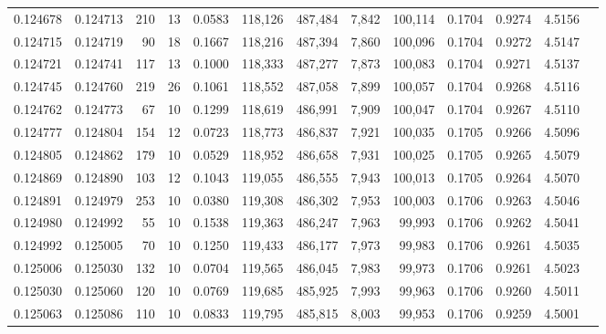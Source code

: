 \begin{tabular}{rrrrrrrrrrrrr}
0.124678 & 0.124713 &   210 &  13 &                                     0.0583 & 118,126 & 487,484 &   7,842 & 100,114 & 0.1704 & 0.9274 & 4.5156 \\
0.124715 & 0.124719 &    90 &  18 &                                     0.1667 & 118,216 & 487,394 &   7,860 & 100,096 & 0.1704 & 0.9272 & 4.5147 \\
0.124721 & 0.124741 &   117 &  13 &                                     0.1000 & 118,333 & 487,277 &   7,873 & 100,083 & 0.1704 & 0.9271 & 4.5137 \\
0.124745 & 0.124760 &   219 &  26 &                                     0.1061 & 118,552 & 487,058 &   7,899 & 100,057 & 0.1704 & 0.9268 & 4.5116 \\
0.124762 & 0.124773 &    67 &  10 &                                     0.1299 & 118,619 & 486,991 &   7,909 & 100,047 & 0.1704 & 0.9267 & 4.5110 \\
0.124777 & 0.124804 &   154 &  12 &                                     0.0723 & 118,773 & 486,837 &   7,921 & 100,035 & 0.1705 & 0.9266 & 4.5096 \\
0.124805 & 0.124862 &   179 &  10 &                                     0.0529 & 118,952 & 486,658 &   7,931 & 100,025 & 0.1705 & 0.9265 & 4.5079 \\
0.124869 & 0.124890 &   103 &  12 &                                     0.1043 & 119,055 & 486,555 &   7,943 & 100,013 & 0.1705 & 0.9264 & 4.5070 \\
0.124891 & 0.124979 &   253 &  10 &                                     0.0380 & 119,308 & 486,302 &   7,953 & 100,003 & 0.1706 & 0.9263 & 4.5046 \\
0.124980 & 0.124992 &    55 &  10 &                                     0.1538 & 119,363 & 486,247 &   7,963 &  99,993 & 0.1706 & 0.9262 & 4.5041 \\
0.124992 & 0.125005 &    70 &  10 &                                     0.1250 & 119,433 & 486,177 &   7,973 &  99,983 & 0.1706 & 0.9261 & 4.5035 \\
0.125006 & 0.125030 &   132 &  10 &                                     0.0704 & 119,565 & 486,045 &   7,983 &  99,973 & 0.1706 & 0.9261 & 4.5023 \\
0.125030 & 0.125060 &   120 &  10 &                                     0.0769 & 119,685 & 485,925 &   7,993 &  99,963 & 0.1706 & 0.9260 & 4.5011 \\
0.125063 & 0.125086 &   110 &  10 &                                     0.0833 & 119,795 & 485,815 &   8,003 &  99,953 & 0.1706 & 0.9259 & 4.5001 \\

\end{tabular}
